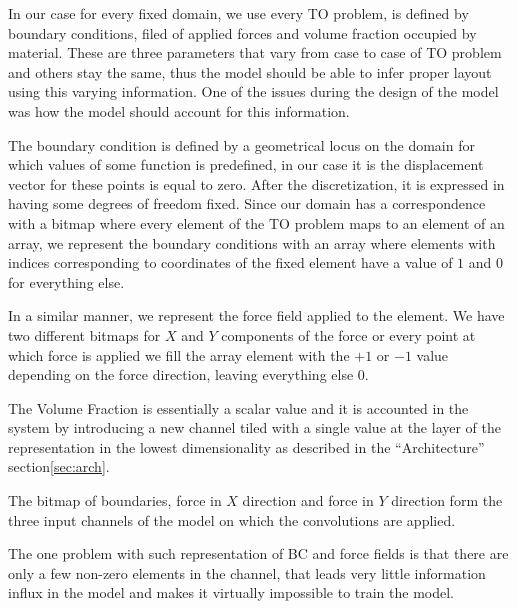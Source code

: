 In our case for every fixed domain, we use every TO problem, is defined by boundary conditions, filed of applied forces and volume fraction occupied by material. 
These are three parameters that vary from case to case of TO problem and others stay the same, thus the model should be able to infer proper layout using this varying information.
One of the issues during the design of the model was how the model should account for this information.
\medskip

The boundary condition is defined by a geometrical locus on the domain for which values of some function is predefined, in our case it is the displacement vector for these points is equal to zero. 
After the discretization, it is expressed in having some degrees of freedom fixed. 
Since our domain has a correspondence with a bitmap where every element of the TO problem maps to an element of an array, we represent the boundary conditions with an array where elements with indices corresponding to coordinates of the fixed element have a value of $1$ and $0$ for everything else.
\medskip

In a similar manner, we represent the force field applied to the element.
We have two different bitmaps for $X$ and $Y$ components of the force or every point at which force is applied we fill the array element with the $+1$ or $-1$ value depending on the force direction, leaving everything else $0$.
\medskip

The Volume Fraction is essentially a scalar value and it is accounted in the system by introducing a new channel tiled with a single value at the layer of the representation in the lowest dimensionality as described in the ``Architecture'' section\ref{sec:arch}.
\medskip

The bitmap of boundaries, force in $X$ direction and force in $Y$ direction form the three input channels of the model on which the convolutions are applied.
\medskip

The one problem with such representation of BC and force fields is that there are only a few non-zero elements in the channel, that leads very little information influx in the model and makes it virtually impossible to train the model.
\medskip

